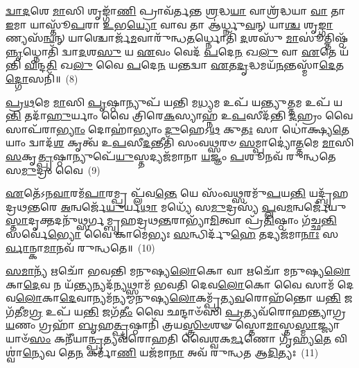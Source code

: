 {%
\-\ul{𑌦𑍍𑌵𑌾}\-\-\ul{𑌦}\-𑌶𑍇 \ul{𑌮𑌾}\-𑌸𑌿 𑌶𑍃𑌙𑍍𑌗𑌾᳴\-\ul{𑌣𑌿} 𑌪𑍍𑌰𑌾𑌵᳴𑌰𑍍𑌤𑌨𑍍𑌤 \ul{𑌶𑍍𑌰}\-𑌦𑍍𑌧\-\ul{𑌯𑌾} 𑌵𑌾𑌶𑍍𑌰᳴𑌦𑍍𑌧𑌯𑌾 \ul{𑌵𑌾} 𑌤𑌾 \ul{𑌇}\-𑌮𑌾 𑌯𑌾𑌸𑍍𑌤𑍂᳴\-\ul{𑌪}\-𑌰𑌾 \ul{𑌉}\-𑌭\-\ul{𑌯𑍍𑌯𑍋} 𑌵𑌾𑌵 𑌤𑌾 𑌆॑𑌰𑍍𑌧𑍍𑌨𑍁\-\ul{𑌵}\-𑌨𑍍 𑌯𑌾\-\ul{𑌶𑍍𑌚} 𑌶𑍃\-\ul{𑌙𑍍𑌗𑌾}\-𑌣𑍍𑌯𑌸᳴\-\ul{𑌨𑍍𑌵}\-𑌨𑍍 𑌯𑌾𑌶𑍍𑌚𑍋𑌰𑍍𑌜᳴\-\ul{𑌮}\-𑌵𑌾𑌰𑍁᳴𑌨𑍍𑌧\-\ul{𑌤}\-𑌰𑍍𑌧𑍍𑌨𑍋𑌤𑌿᳴ \ul{𑌦}\-𑌶𑌸𑍁᳴ \ul{𑌮𑌾}\-𑌸𑍂॑𑌤𑍍𑌤𑌿𑌷𑍍𑌠᳴\-\ul{𑌨𑍍𑌨𑍃}\-𑌧𑍍𑌨𑍋𑌤𑌿᳴ 𑌦𑍍𑌵𑌾\-\ul{𑌦}\-𑌶\-\ul{𑌸𑍁} 𑌯 \ul{𑌏}\-𑌵𑌂 𑌵𑍇𑌦᳴ \ul{𑌪}\-𑌦𑍇\-\ul{𑌨} 𑌖\-\ul{𑌲𑍁} 𑌵𑌾 \ul{𑌏}\-𑌤𑍇 𑌯᳴𑌨𑍍𑌤𑌿 \ul{𑌵𑌿}\-𑌨𑍍𑌦\-\ul{𑌤𑌿} 𑌖\-\ul{𑌲𑍁} 𑌵𑍈 \ul{𑌪}\-𑌦𑍇\-\ul{𑌨} 𑌯𑌨𑍍𑌤𑌦𑍍𑌵𑌾 \ul{𑌏}\-𑌤\-\ul{𑌦𑍃}\-𑌦𑍍𑌧𑌮𑌯᳴\-\ul{𑌨}\-𑌨𑍍𑌤𑌸𑍍𑌮𑌾᳴\-\ul{𑌦𑍇}\-𑌤\-\ul{𑌦𑍍𑌗𑍋}\-𑌸𑌨𑌿᳴॥~(8)

{\anuvakamend[{\-\ul{𑌤𑌿}\-\-\ul{𑌷𑍍𑌠𑌾}\-𑌮𑍇\-\ul{𑌤𑌿} 𑌤𑌾\-\ul{𑌸𑌾}\-𑌨𑍍𑌤\-\ul{𑌸𑍍𑌮𑌾}\-𑌦𑍍𑌦𑍍𑌵𑍇 𑌚᳴}]}%

\-\ul{𑌪𑍍𑌰}\-\-\ul{𑌥}\-𑌮𑍇 \ul{𑌮𑌾}\-𑌸𑌿 \ul{𑌪𑍃}\-𑌷𑍍𑌠𑌾𑌨𑍍𑌯𑍁𑌪᳴ 𑌯𑌨𑍍𑌤𑌿 𑌮\-\ul{𑌧𑍍𑌯}\-𑌮 𑌉𑌪᳴ 𑌯𑌨𑍍𑌤𑍍𑌯𑍁\-\ul{𑌤𑍍𑌤}\-𑌮 𑌉𑌪᳴ 𑌯\-\ul{𑌨𑍍𑌤𑌿} 𑌤𑌦𑌾᳴\-\ul{𑌹𑍁}\-𑌰𑍍𑌯𑌾𑌂 𑌵𑍈 𑌤𑍍𑌰𑌿𑌰𑍇\-\ul{𑌕}\-𑌸𑍍𑌯𑌾𑌹𑍍𑌨᳴ 𑌉\-\ul{𑌪}\-𑌸𑍀𑌦᳴𑌨𑍍𑌤𑌿 \ul{𑌦}\-𑌹𑍍𑌰𑌂 𑌵𑍈 𑌸𑌾𑌪᳴𑌰𑌾\-\ul{𑌭𑍍𑌯𑌾𑌂} 𑌦𑍋𑌹𑌾॑𑌭𑍍𑌯𑌾𑌂 \ul{𑌦𑍁}\-𑌹𑍇\-𑌽\-\ul{𑌥} 𑌕𑍁\-\ul{𑌤𑌃} 𑌸𑌾 𑌧𑍋॑𑌕𑍍𑌷𑍍𑌯\-\ul{𑌤𑍇} 𑌯𑌾𑌂 𑌦𑍍𑌵𑌾𑌦᳴\-\ul{𑌶} 𑌕𑍃𑌤𑍍𑌵᳴ 𑌉\-\ul{𑌪}\-𑌸𑍀\-\ul{𑌦}\-𑌨𑍍𑌤𑍀𑌤𑌿᳴ 𑌸𑌂𑌵\-\ul{𑌥𑍍𑌸}\-𑌰𑍞 \ul{𑌸}\-𑌮𑍍𑌪𑌾𑌦𑍍𑌯𑍋॑\-\ul{𑌤𑍍𑌤}\-𑌮𑍇 \ul{𑌮𑌾}\-𑌸𑌿 \ul{𑌸}\-𑌕𑍃\-\ul{𑌤𑍍𑌪𑍃}\-𑌷𑍍𑌠𑌾𑌨𑍍𑌯𑍁𑌪𑍇᳴\-\ul{𑌯𑍁}\-𑌸𑍍𑌤𑌦𑍍𑌯𑌜᳴𑌮𑌾𑌨𑌾 \ul{𑌯}\-𑌜𑍍𑌞𑌂 \ul{𑌪}\-𑌶𑍂𑌨𑌵᳴ 𑌰𑍁𑌨𑍍𑌧𑌤𑍇 𑌸\-\ul{𑌮𑍁}\-𑌦𑍍𑌰𑌂 𑌵𑍈~(9)

\-\ul{𑌏}\-𑌤𑍇᳴\-𑌽𑌨\-\ul{𑌵𑌾}\-𑌰𑌮᳴\-\ul{𑌪𑌾}\-𑌰𑌮𑍍𑌪𑍍𑌰 𑌪𑍍𑌲᳴𑌵\-\ul{𑌨𑍍𑌤𑍇} 𑌯𑍇 𑌸𑌂᳴𑌵\-\ul{𑌥𑍍𑌸}\-𑌰𑌮𑍁᳴\-\ul{𑌪}\-𑌯\-\ul{𑌨𑍍𑌤𑌿} 𑌯𑌦𑍍𑌬𑍃᳴𑌹𑌦𑍍𑌰𑌥\-\ul{𑌨𑍍𑌤}\-𑌰𑍇 \ul{𑌅}\-𑌨𑍍𑌵𑌰𑍍𑌜𑍇᳴\-\ul{𑌯𑍁}\-𑌰𑍍𑌯\-\ul{𑌥𑌾} 𑌮𑌧𑍍𑌯𑍇᳴ 𑌸\-\ul{𑌮𑍁}\-𑌦𑍍𑌰𑌸𑍍𑌯᳴ \ul{𑌪𑍍𑌲}\-𑌵\-\ul{𑌮}\-𑌨𑍍𑌵𑌰𑍍𑌜𑍇᳴𑌯𑍁\-\ul{𑌸𑍍𑌤𑌾}\-𑌦𑍃𑌕𑍍𑌤\-𑌦𑌨𑍁᳴𑌥𑍍𑌸𑌰𑍍𑌗𑌮𑍍𑌬𑍃𑌹𑌦𑍍𑌰𑌥\-\ul{𑌨𑍍𑌤}\-𑌰𑌾𑌭𑍍𑌯𑌾᳴\-\ul{𑌮𑌿}\-𑌤𑍍𑌵𑌾 𑌪𑍍𑌰᳴\-\ul{𑌤𑌿}\-𑌷𑍍𑌠𑌾𑌂 𑌗᳴𑌚𑍍𑌛\-\ul{𑌨𑍍𑌤𑌿} 𑌸𑌰𑍍𑌵𑍇॑\-\ul{𑌭𑍍𑌯𑍋} 𑌵𑍈 𑌕𑌾𑌮𑍇॑𑌭𑍍𑌯𑌃 \ul{𑌸}\-𑌨𑍍𑌧𑌿𑌰𑍍𑌦𑍁᳴\-\ul{𑌹𑍇} 𑌤𑌦𑍍𑌯𑌜᳴𑌮𑌾\-\ul{𑌨𑌾𑌃} 𑌸\-\ul{𑌰𑍍𑌵𑌾}\-𑌨𑍍𑌕𑌾\-\ul{𑌮𑌾}\-𑌨𑌵᳴ 𑌰𑍁𑌨𑍍𑌧𑌤𑍇॥~(10)

{\anuvakamend[{\-\ul{𑌸}\-\-\ul{𑌮𑍁}\-𑌦𑍍𑌰𑌂 𑌵𑍈 𑌚𑌤𑍁᳴𑌸𑍍𑌤𑍍𑌰𑌿𑍞𑌶𑌚𑍍𑌚}]}%

\-\ul{𑌸}\-\-\ul{𑌮𑌾}\-𑌨𑍍𑌯᳴ 𑌋𑌚𑍋᳴ 𑌭𑌵𑌨𑍍𑌤𑌿 𑌮𑌨𑍁𑌷𑍍𑌯\-\ul{𑌲𑍋}\-𑌕𑍋 𑌵𑌾 𑌋𑌚𑍋᳴ 𑌮𑌨𑍁𑌷𑍍𑌯\-\ul{𑌲𑍋}\-𑌕𑌾\-\ul{𑌦𑍇}\-𑌵 𑌨 𑌯᳴\-\ul{𑌨𑍍𑌤𑍍𑌯}\-𑌨𑍍𑌯𑌦᳴\-\ul{𑌨𑍍𑌯}\-𑌥𑍍𑌸𑌾𑌮᳴ 𑌭𑌵𑌤𑌿 𑌦𑍇𑌵\-\ul{𑌲𑍋}\-𑌕𑍋 𑌵𑍈 𑌸𑌾𑌮᳴ 𑌦𑍇𑌵\-\ul{𑌲𑍋}\-𑌕𑌾\-\ul{𑌦𑍇}\-𑌵𑌾𑌨𑍍𑌯𑌮᳴𑌨𑍍𑌯𑌮𑍍𑌮𑌨𑍁𑌷𑍍𑌯\-\ul{𑌲𑍋}\-𑌕𑌮𑍍𑌪𑍍𑌰᳴𑌤𑍍𑌯\-\ul{𑌵}\-𑌰𑍋𑌹᳴𑌨𑍍𑌤𑍋 𑌯\-\ul{𑌨𑍍𑌤𑌿} 𑌜𑌗᳴\-\ul{𑌤𑍀}\-𑌮\-\ul{𑌗𑍍𑌰} 𑌉𑌪᳴ 𑌯\-\ul{𑌨𑍍𑌤𑌿} 𑌜𑌗᳴\-\ul{𑌤𑍀𑌂} 𑌵𑍈 𑌛𑌨𑍍𑌦𑌾𑍞᳴𑌸𑌿 \ul{𑌪𑍍𑌰}\-𑌤𑍍𑌯𑌵᳴𑌰𑍋𑌹𑌨𑍍𑌤𑍍𑌯𑌾𑌗𑍍𑌰\-\ul{𑌯}\-𑌣𑌂 𑌗𑍍𑌰𑌹𑌾᳴ \ul{𑌬𑍃}\-𑌹\-\ul{𑌤𑍍𑌪𑍃}\-𑌷𑍍𑌠𑌾𑌨𑌿᳴ 𑌤𑍍𑌰𑌯\-\ul{𑌸𑍍𑌤𑍍𑌰𑌿}\-\-\ul{𑍞}\-𑌶𑍟 𑌸𑍍𑌤𑍋\-\ul{𑌮𑌾}\-𑌸𑍍𑌤\-\ul{𑌸𑍍𑌮𑌾}\-𑌜𑍍𑌜𑍍𑌯𑌾𑌯𑌾𑍞᳴\-\ul{𑌸𑌂} 𑌕𑌨𑍀᳴𑌯𑌾\-\ul{𑌨𑍍𑌪𑍍𑌰}\-𑌤𑍍𑌯𑌵᳴𑌰𑍋𑌹𑌤𑌿 𑌵𑍈𑌶𑍍𑌵𑌕\-\ul{𑌰𑍍𑌮}\-𑌣𑍋 𑌗𑍃᳴𑌹𑍍𑌯\-\ul{𑌤𑍇} 𑌵𑌿𑌶𑍍𑌵𑌾॑\-\ul{𑌨𑍍𑌯𑍇}\-𑌵 𑌤𑍇\-\ul{𑌨} 𑌕𑌰𑍍𑌮𑌾᳴\-\ul{𑌣𑌿} 𑌯𑌜᳴𑌮𑌾\-\ul{𑌨𑌾} 𑌅𑌵᳴ 𑌰𑍁𑌨𑍍𑌧𑌤 𑌆\-\ul{𑌦𑌿}\-𑌤𑍍𑌯𑌃~(11)

}
